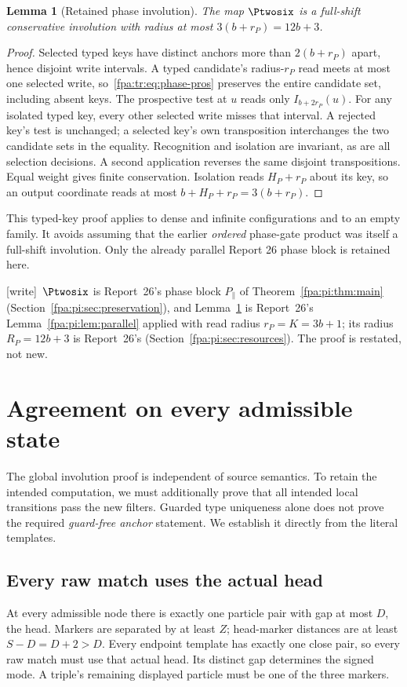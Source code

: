 \documentclass[11pt,a4paper]{article}
\numberwithin{equation}{section}
\newtheorem{lemma}[theorem]{Lemma}
\newcommand{\wtag}{\textup{[write]}}
\begin{document}
\begin{lemma}[Retained phase involution]\label{fpa:tr:lem:phase}
The map $\Ptwosix$ is a full-shift conservative involution with radius at most $3(b+r_P)=12b+3$.
\end{lemma}
\begin{proof}
Selected typed keys have distinct anchors more than $2(b+r_P)$ apart, hence disjoint write intervals. A typed candidate's radius-$r_P$ read meets at most one selected write, so~\eqref{fpa:tr:eq:phase-pros} preserves the entire candidate set, including absent keys. The prospective test at $u$ reads only $I_{b+2r_P}(u)$. For any isolated typed key, every other selected write misses that interval. A rejected key's test is unchanged; a selected key's own transposition interchanges the two candidate sets in the equality. Recognition and isolation are invariant, as are all selection decisions. A second application reverses the same disjoint transpositions. Equal weight gives finite conservation. Isolation reads $H_P+r_P$ about its key, so an output coordinate reads at most $b+H_P+r_P=3(b+r_P)$.
\end{proof}

This typed-key proof applies to dense and infinite configurations and to an empty family. It avoids assuming that the earlier \emph{ordered} phase-gate product was itself a full-shift involution. Only the already parallel Report 26 phase block is retained here.

\wtag\ $\Ptwosix$ is Report~26's phase block $P_\parallel$ of Theorem~\ref{fpa:pi:thm:main} (Section~\ref{fpa:pi:sec:preservation}), and Lemma~\ref{fpa:tr:lem:phase} is Report~26's Lemma~\ref{fpa:pi:lem:parallel} applied with read radius $r_P=K=3b+1$; its radius $R_P=12b+3$ is Report~26's (Section~\ref{fpa:pi:sec:resources}). The proof is restated, not new.
\section{Agreement on every admissible state}\label{fpa:tr:sec:preservation}
The global involution proof is independent of source semantics. To retain the intended computation, we must additionally prove that all intended local transitions pass the new filters. Guarded type uniqueness alone does not prove the required \emph{guard-free anchor} statement. We establish it directly from the literal templates.

\subsection{Every raw match uses the actual head}
At every admissible node there is exactly one particle pair with gap at most $D$, the head. Markers are separated by at least $Z$; head-marker distances are at least $S-D=D+2>D$. Every endpoint template has exactly one close pair, so every raw match must use that actual head. Its distinct gap determines the signed mode. A triple's remaining displayed particle must be one of the three markers.
\end{document}
